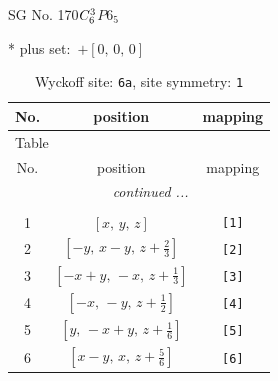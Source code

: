 \documentclass[fleqn,8pt]{jsarticle}
\begin{document}
\setcounter{MaxMatrixCols}{32}

\renewcommand{\tablename}{Table~}
\renewcommand{\figurename}{Figure~}
\begin{center}
\LARGE
SG No. 170\quad$C_{\rm 6}^{3}$\quad$P6_5$\quad[ hexagonal ]
\end{center}
* plus set:\,\,\,$+\left[ 0,\, 0,\, 0 \right]$
\renewcommand{\arraystretch}{1.2}
\begin{longtable}{ccc}
\caption{Wyckoff site: {\tt 6a}, site symmetry: {\tt 1}}
 \\
 \hline \hline
No. & position & mapping \\ \hline \endfirsthead

\multicolumn{2}{l}{\tablename\ \thetable{}} \\
 \hline \hline
No. & position & mapping \\ \hline \endhead

 \hline \hline
\multicolumn{2}{r}{\footnotesize\it continued ...} \\ \endfoot

 \hline \hline
\multicolumn{2}{r}{} \\ \endlastfoot

1 & $\left[ x,\, y,\, z \right]$ & {\tt [1]} \\ \hline
2 & $\left[ - y,\, x - y,\, z + \frac{2}{3} \right]$ & {\tt [2]} \\ \hline
3 & $\left[ - x + y,\, - x,\, z + \frac{1}{3} \right]$ & {\tt [3]} \\ \hline
4 & $\left[ - x,\, - y,\, z + \frac{1}{2} \right]$ & {\tt [4]} \\ \hline
5 & $\left[ y,\, - x + y,\, z + \frac{1}{6} \right]$ & {\tt [5]} \\ \hline
6 & $\left[ x - y,\, x,\, z + \frac{5}{6} \right]$ & {\tt [6]} \\
\end{longtable}
\end{document}
